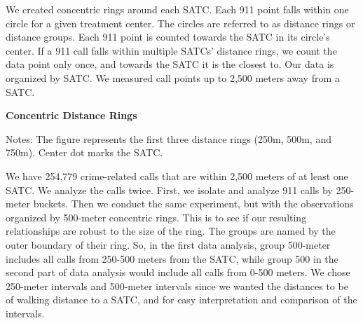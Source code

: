 \documentclass[12pt]{article}
\begin{document}
We created concentric rings around each SATC. Each 911 point falls within one circle for a given treatment center.  The circles are referred to as distance rings or distance groups. Each 911 point is counted towards the SATC in its circle's center. If a 911 call falls within multiple SATCs' distance rings, we count the data point only once, and towards the SATC it is the closest to. Our data is organized by SATC. We measured call points up to 2,500 meters away from a SATC.  
\begin{center}

    \vspace{0.5em}
    \textbf{Concentric Distance Rings}

    {\small Notes: The figure represents the first three distance rings (250m, 500m, and 750m). Center dot marks the SATC.}
\end{center}
 We have 254,779 crime-related calls that are within 2,500 meters of at least one SATC. We analyze the calls twice. First, we isolate and analyze 911 calls by 250-meter buckets. Then we conduct the same experiment, but with the observations organized by 500-meter concentric rings. This is to see if our resulting relationships are robust to the size of the ring. The groups are named by the outer boundary of their ring. So, in the first data analysis, group 500-meter includes all calls from 250-500 meters from the SATC, while group 500 in the second part of data analysis would include all calls from 0-500 meters. We chose 250-meter intervals and 500-meter intervals since we wanted the distances to be of walking distance to a SATC, and for easy interpretation and comparison of the intervals. 
\end{document}
